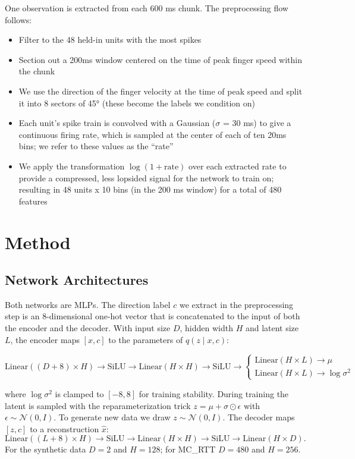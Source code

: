 \documentclass[10pt]{article}
\begin{document}
One observation is extracted from each 600 ms chunk.
The preprocessing flow follows:

\begin{itemize}
  \item Filter to the 48 held-in units with the most spikes
  \item Section out a 200ms window centered on the time of peak finger speed within the chunk
  \item We use the direction of the finger velocity at the time of peak speed and split it into 8 sectors of 45° (these become the labels we condition on)
  \item Each unit's spike train is convolved with a Gaussian ($\sigma$ = 30 ms) to give a continuous firing rate, which is sampled at the center of each of ten 20ms bins; we refer to these values as the ``rate''
  \item We apply the transformation $\log(1 + \text{rate})$ over each extracted rate to provide a compressed, less lopsided signal for the network to train on; resulting in 48 units x 10 bins (in the 200 ms window) for a total of 480 features
\end{itemize}

\section{Method}
\subsection{Network Architectures}

Both networks are MLPs.
The direction label $c$ we extract in the preprocessing step is an 8-dimensional one-hot vector that is concatenated to the input of both the encoder and the decoder.
With input size $D$, hidden width $H$ and latent size $L$, the encoder maps $[x, c]$ to the parameters of $q(z \mid x, c)$:

\[
  \text{Linear}((D+8) \times H) \to \text{SiLU} \to
  \text{Linear}(H \times H) \to \text{SiLU} \to
  \begin{cases}
    \text{Linear}(H \times L) \to \mu \\
    \text{Linear}(H \times L) \to \log\sigma^2
  \end{cases}
\]

where $\log\sigma^2$ is clamped to $[-8, 8]$ for training stability.
During training the latent is sampled with the reparameterization trick $z = \mu + \sigma \odot \epsilon$ with $\epsilon \sim \mathcal{N}(0, I)$.
To generate new data we draw $z \sim \mathcal{N}(0, I)$.
The decoder maps $[z, c]$ to a reconstruction $\hat{x}$:
\[
  \text{Linear}((L+8) \times H) \to \text{SiLU} \to
  \text{Linear}(H \times H) \to \text{SiLU} \to
  \text{Linear}(H \times D).
\]
For the synthetic data $D = 2$ and $H = 128$; for MC\_RTT $D = 480$ and $H = 256$.
\end{document}
